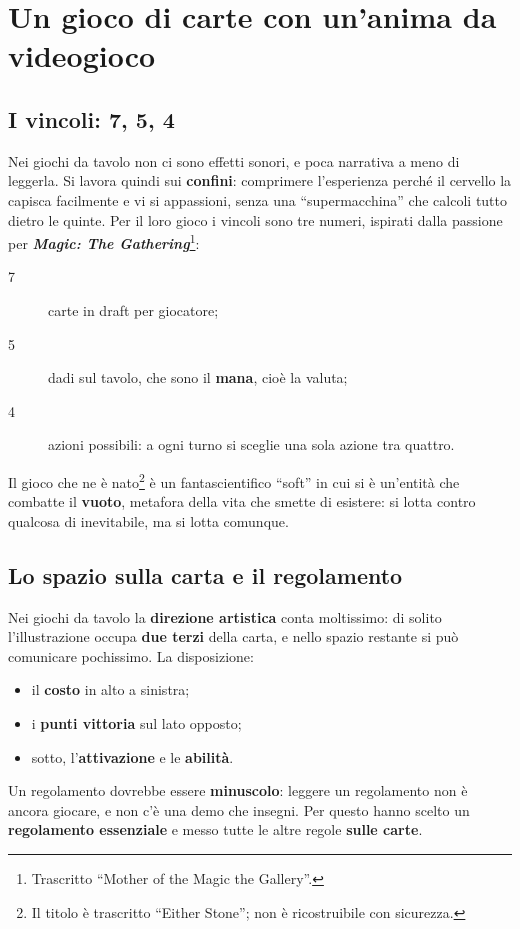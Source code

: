 \section{Un gioco di carte con un'anima da videogioco}
\label{sec:c3-5-754}

\subsection{I vincoli: 7, 5, 4}

Nei giochi da tavolo non ci sono effetti sonori, e poca narrativa a meno di
leggerla. Si lavora quindi sui \textbf{confini}: comprimere l'esperienza perché il
cervello la capisca facilmente e vi si appassioni, senza una ``supermacchina'' che
calcoli tutto dietro le quinte. Per il loro gioco i vincoli sono tre numeri, ispirati
dalla passione per \textbf{\emph{Magic: The Gathering}}\footnote{Trascritto
``Mother of the Magic the Gallery''.}:
\begin{description}
  \item[7] carte in draft per giocatore;
  \item[5] dadi sul tavolo, che sono il \textbf{mana}, cioè la valuta;
  \item[4] azioni possibili: a ogni turno si sceglie una sola azione tra quattro.
\end{description}
Il gioco che ne è nato\footnote{Il titolo è trascritto ``Either Stone''; non è
ricostruibile con sicurezza.} è un fantascientifico ``soft'' in cui si è
un'entità che combatte il \textbf{vuoto}, metafora della vita che smette di
esistere: si lotta contro qualcosa di inevitabile, ma si lotta comunque.

\subsection{Lo spazio sulla carta e il regolamento}

Nei giochi da tavolo la \textbf{direzione artistica} conta moltissimo: di solito
l'illustrazione occupa \textbf{due terzi} della carta, e nello spazio restante si
può comunicare pochissimo. La disposizione:
\begin{itemize}
  \item il \textbf{costo} in alto a sinistra;
  \item i \textbf{punti vittoria} sul lato opposto;
  \item sotto, l'\textbf{attivazione} e le \textbf{abilità}.
\end{itemize}
Un regolamento dovrebbe essere \textbf{minuscolo}: leggere un regolamento non è
ancora giocare, e non c'è una demo che insegni. Per questo hanno scelto un
\textbf{regolamento essenziale} e messo tutte le altre regole \textbf{sulle carte}.

